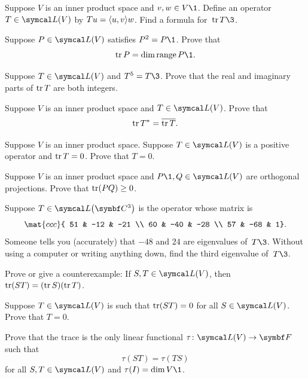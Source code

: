 \begin{exercises}

\exercise
Suppose $V$ is an inner product space and $v, w \in V\1$.  Define an operator
$T \in \L(V)$ by $Tu = \langle u, v\rangle w$.  Find a formula for~$\tr T\3$.


\exercise
Suppose $P \in \L(V)$ satisfies $P^2 = P\1$. Prove that
\[
\tr P = \dim \ran P\1.
\]
\exercisedisplayend


\exercise
Suppose $T \in \L(V)$ and $T^5 = T\3$. Prove that the real and imaginary parts of $\operatorname{tr} T$ are both integers.


\exercise
Suppose $V$ is an inner product space and $T \in \L(V)$. Prove that \label{393}
\[
\operatorname{tr} T^* = \overline{\operatorname{tr} T}.
\]
\exercisedisplayend


\exercise
Suppose $V$ is an inner product space.  Suppose $T \in \L(V)$ is a positive
operator and $\operatorname{tr} T = 0$. Prove that $T = 0$. \label{391}


\exercise
Suppose $V$ is an inner product space and $P\1, Q \in \L(V)$ are orthogonal projections. Prove that $\operatorname{tr}(PQ) \ge 0$.


\exercise
Suppose $T \in \L\paren[\big]{\C{3}}$ is the operator whose matrix is
\[
\mat{ccc}{
51 & -12 & -21 \\
60 & -40 & -28 \\
57 & -68 & 1}.
\]
Someone tells you (accurately) that $-48$ and $24$ are eigenvalues of~$T\3$.
Without using a computer or writing anything down, find the third eigenvalue
of~$T\3$.


\exercise
Prove or give a counterexample: If $S, T \in \L(V)$, then
$
\operatorname{tr} (ST) = (\operatorname{tr} S) (\operatorname{tr} T)$.


\exercise
Suppose $T \in \L(V)$ is such that $\operatorname{tr}(ST) = 0$ for all $S \in \L(V)$. Prove that $T = 0$.


\exercise
Prove that the trace is the only linear functional $\fun \tau {\L(V)} {\F{}}$ such that\label{9trChar}
\[
\tau(ST) = \tau(TS)\]
for all $S, T \in \L(V)$ and $\tau(I) = \dim V\1$.



\end{exercises}
